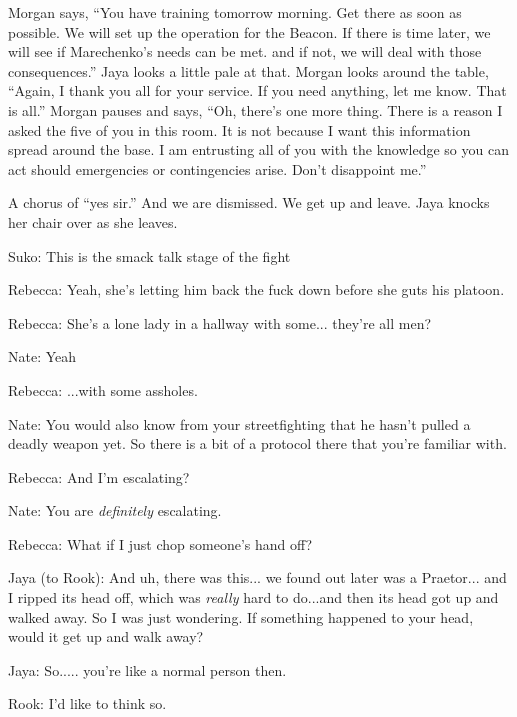 Morgan says, ``You have training tomorrow morning.  Get there as soon as possible.  We will set up the operation for the Beacon.  If there is time later, we will see if Marechenko's needs can be met.  and if not, we will deal with those consequences.''  Jaya looks a little pale at that.  Morgan looks around the table, ``Again, I thank you all for your service.  If you need anything, let me know.  That is all.''  Morgan pauses and says, ``Oh, there's one more thing.  There is a reason I asked the five of you in this room.  It is not because I want this information spread around the base.  I am entrusting all of you with the knowledge so you can act should emergencies or contingencies arise.  Don't disappoint me.''

A chorus of ``yes sir.''  And we are dismissed.  We get up and leave. Jaya knocks her chair over as she leaves.







Suko: This is the smack talk stage of the fight

Rebecca: Yeah, she's letting him back the fuck down before she guts his platoon.



Rebecca: She's a lone lady in a hallway with some... they're all men?

Nate: Yeah

Rebecca: ...with some assholes.



Nate: You would also know from your streetfighting that he hasn't pulled a deadly weapon yet.  So there is a bit of a protocol there that you're familiar with.

Rebecca: And I'm escalating?

Nate: You are \textit{definitely} escalating.

Rebecca: What if I just chop someone's hand off?



Jaya (to Rook): And uh, there was this... we found out later was a Praetor... and I ripped its head off, which was \textit{really} hard to do...and then its head got up and walked away.  So I was just wondering.  If something happened to your head, would it get up and walk away?



Jaya: So..... you're like a normal person then.

Rook: I'd like to think so.



